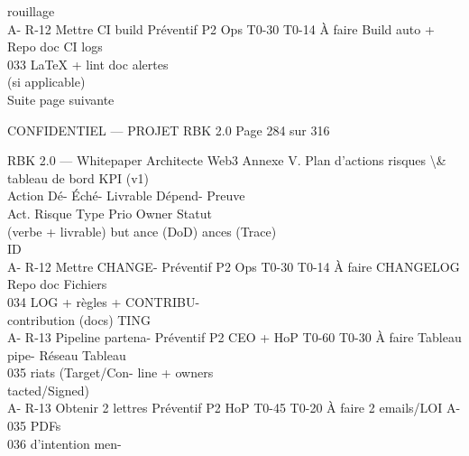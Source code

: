 \documentclass[12pt,landscape,a4paper]{article}
\newenvironment{confidential}
{\begin{tcolorbox}[
    colback=rbkred!5!white,
    colframe=rbkred!75!black,
    title=CONFIDENTIEL,
    fonttitle=\bfseries\color{white},
    coltitle=rbkred!75!black,
    breakable,
    enhanced,
    frame hidden,
    borderline west={2pt}{0pt}{rbkred!75!black}
]}
{\end{tcolorbox}}
\begin{document}
rouillage\\
A- R-12     Mettre CI build      Préventif P2   Ops         T0-30 T0-14 À faire   Build auto +    Repo doc CI logs\\
033         LaTeX + lint doc                                                      alertes\\
(si applicable)\\
Suite page suivante\\
\vspace{0.5em}
\vspace{0.5em}
\vspace{0.5em}
\vspace{0.5em}
\begin{confidential}CONFIDENTIEL — PROJET RBK 2.0                                          Page 284 sur 316\end{confidential}
RBK 2.0 — Whitepaper Architecte Web3                                                                 Annexe V. Plan d’actions risques \textbackslash{}& tableau de bord KPI (v1)\\
\vspace{0.5em}
\vspace{0.5em}
Action                                           Dé- Éché-             Livrable        Dépend- Preuve\\
Act. Risque                      Type      Prio Owner                    Statut\\
(verbe + livrable)                               but ance              (DoD)           ances   (Trace)\\
ID\\
A- R-12     Mettre CHANGE-       Préventif P2   Ops          T0-30 T0-14 À faire   CHANGELOG Repo doc Fichiers\\
034         LOG + règles                                                           + CONTRIBU-\\
contribution (docs)                                                    TING\\
A- R-13     Pipeline partena-    Préventif P2   CEO + HoP T0-60 T0-30 À faire      Tableau pipe- Réseau Tableau\\
035         riats (Target/Con-                                                     line + owners\\
tacted/Signed)\\
A- R-13     Obtenir 2 lettres    Préventif P2   HoP          T0-45 T0-20 À faire   2 emails/LOI    A-035      PDFs\\
036         d’intention men-\\
\end{document}
